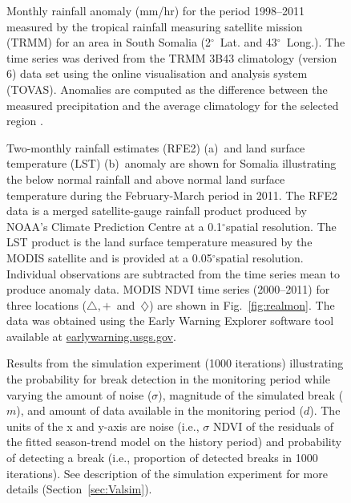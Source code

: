 \documentclass[authoryear,preprint,review,10pt]{elsarticle}
\newcommand{\degree}{\ensuremath{^\circ}}
\begin{document}
 \begin{figure}[htp]
\centering
  \caption{Monthly rainfall anomaly (mm/hr) for the period 1998--2011 measured by the tropical rainfall measuring satellite mission (TRMM) for an area in South Somalia (2\degree~Lat. and 43\degree~Long.). The time series was derived from the TRMM 3B43 climatology (version 6) data set using the online visualisation and analysis system (TOVAS). Anomalies are computed as the difference between the measured precipitation and the average climatology for the selected region \citep{Acker:2007vk}.}
  \label{fig:RF}
\end{figure}

\begin{figure} [htp]
\centering
 \caption{Two-monthly rainfall estimates (RFE2) (a)~and land surface temperature (LST) (b)~anomaly are shown for Somalia illustrating the below normal
 rainfall and above normal land surface temperature during the February-March period in 2011. The RFE2 data is a merged satellite-gauge rainfall product
 produced by NOAA's Climate Prediction Centre at a 0.1\degree spatial resolution. The LST product is the land surface temperature measured by the MODIS
 satellite and is provided at a 0.05\degree spatial resolution. Individual observations are subtracted from the time series mean to produce anomaly data. MODIS
 NDVI time series (2000--2011) for three locations ($\triangle,+$~and~$\diamondsuit$) are shown in Fig.~\ref{fig:realmon}. The data was obtained using the Early Warning Explorer software tool available at \url{earlywarning.usgs.gov}. }
 \label{fig:RF_LSTSomalia}
\end{figure}

\begin{figure}[htp]
\centering
  \caption{Results from the simulation experiment (1000 iterations) illustrating the probability for break detection in the monitoring period while varying the amount of noise ($\sigma$), magnitude of the simulated break ($m$), and amount of data  available in the monitoring period ($d$). The units of the x and y-axis are noise (i.e., $\sigma$ NDVI of the residuals of the fitted season-trend model on the history period) and probability of detecting a break (i.e., proportion of detected breaks in 1000 iterations). See description of the simulation experiment for more details (Section~\ref{sec:Valsim}). }
  \label{fig:SimNr}
\end{figure}
\end{document}

